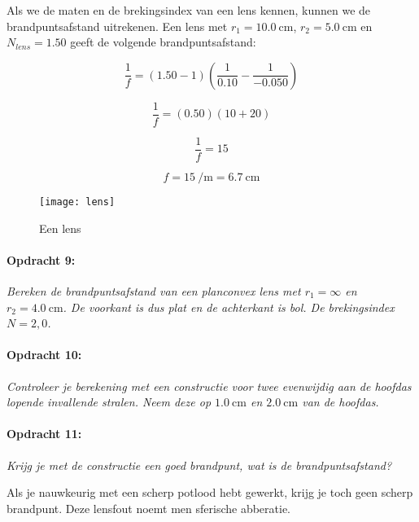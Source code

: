 Als we de maten en de brekingsindex van een lens kennen, kunnen we
de brandpuntsafstand uitrekenen. Een lens met $r_{1}=\SI{10.0}{\centi\meter}$,
$r_{2}=\SI{5.0}{\centi\meter}$ en $N_{lens}=1.50$ geeft de volgende brandpuntsafstand:

\[
\frac{1}{f}=(1.50-1)(\frac{1}{0.10}-\frac{1}{-0.050})
\]


\[
\frac{1}{f}=(0.50)(10+20)
\]


\[
\frac{1}{f}=15
\]


\[
f=\SI{15}{\per\meter}=\SI{6.7}{\centi\meter}
\]


\begin{figure}[H]
\noindent \begin{centering}
\texttt{[image: lens]}
\par\end{centering}

\caption{Een lens}
\end{figure}



\paragraph*{Opdracht 9:}

\emph{Bereken de brandpuntsafstand van een planconvex lens met $r_{1}=\infty$
en $r_{2}=\SI{4.0}{\centi\meter}$. De voorkant is dus plat en de achterkant
is bol. De brekingsindex $N=2,0$.}


\paragraph*{Opdracht 10:}

\emph{Controleer je berekening met een constructie voor twee evenwijdig
aan de hoofdas lopende invallende stralen. Neem deze op $\SI{1.0}{\centi\meter}$
en $\SI{2.0}{\centi\meter}$ van de hoofdas.}


\paragraph*{Opdracht 11:}

\emph{Krijg je met de constructie een goed brandpunt, wat is de brandpuntsafstand?}

Als je nauwkeurig met een scherp potlood hebt gewerkt, krijg je toch
geen scherp brandpunt. Deze lensfout noemt men sferische abberatie.


